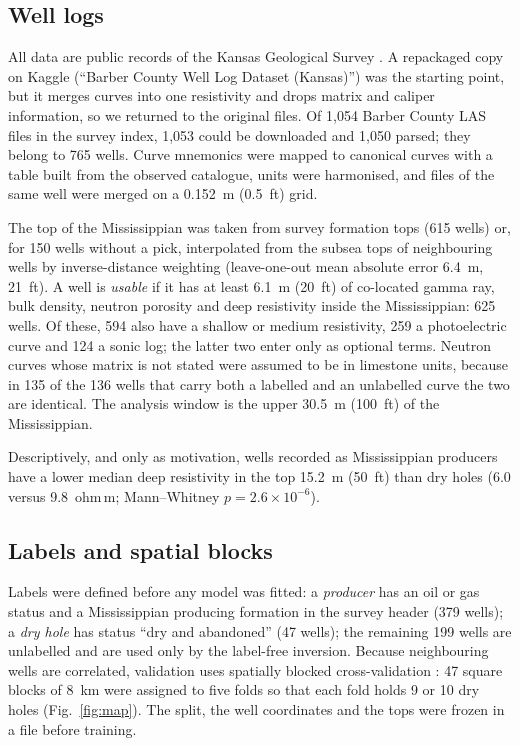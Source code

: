 \documentclass[preprint,12pt]{elsarticle}
\begin{document}
\subsection{Well logs}
All data are public records of the Kansas Geological Survey \citep{kgsdata}. A repackaged
copy on Kaggle (``Barber County Well Log Dataset (Kansas)'') was the starting point, but it
merges curves into one resistivity and drops matrix and caliper information, so we returned to
the original files. Of 1,054 Barber County LAS files in the survey index, 1,053 could be
downloaded and 1,050 parsed; they belong to 765 wells. Curve mnemonics were mapped to canonical
curves with a table built from the observed catalogue, units were harmonised, and files of the
same well were merged on a 0.152~m (0.5~ft) grid.

The top of the Mississippian was taken from survey formation tops (615 wells) or, for 150 wells
without a pick, interpolated from the subsea tops of neighbouring wells by inverse-distance
weighting (leave-one-out mean absolute error 6.4~m, 21~ft). A well is \emph{usable} if it has at least
6.1~m (20~ft) of co-located gamma ray, bulk density, neutron porosity and deep resistivity inside the
Mississippian: 625 wells. Of these, 594 also have a shallow or medium resistivity, 259 a
photoelectric curve and 124 a sonic log; the latter two enter only as optional terms. Neutron
curves whose matrix is not stated were assumed to be in limestone units, because in 135 of the
136 wells that carry both a labelled and an unlabelled curve the two are identical. The analysis
window is the upper 30.5~m (100~ft) of the Mississippian.

Descriptively, and only as motivation, wells recorded as Mississippian producers have a lower
median deep resistivity in the top 15.2~m (50~ft) than dry holes (6.0 versus 9.8~ohm\,m; Mann--Whitney
$p = 2.6\times10^{-6}$).

\subsection{Labels and spatial blocks}
Labels were defined before any model was fitted: a \emph{producer} has an oil or gas status and
a Mississippian producing formation in the survey header (379 wells); a \emph{dry hole} has
status ``dry and abandoned'' (47 wells); the remaining 199 wells are unlabelled and are used
only by the label-free inversion. Because neighbouring wells are correlated, validation uses
spatially blocked cross-validation \citep{roberts2017cv}: 47 square blocks of 8~km were assigned
to five folds so that each fold holds 9 or 10 dry holes (Fig.~\ref{fig:map}). The split, the
well coordinates and the tops were frozen in a file before training.
\end{document}
